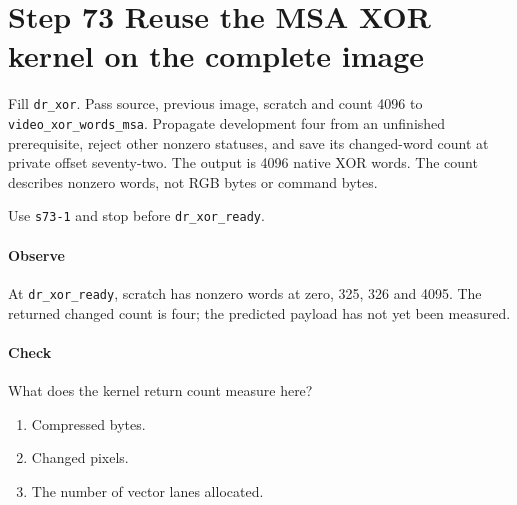 \section{Step 73 Reuse the MSA XOR kernel on the complete image}
Fill \texttt{dr\_xor}. Pass source, previous image, scratch and count 4096 to \texttt{video\_xor\_words\_msa}. Propagate development four from an unfinished prerequisite, reject other nonzero statuses, and save its changed-word count at private offset seventy-two. The output is 4096 native XOR words. The count describes nonzero words, not RGB bytes or command bytes.

Use \texttt{s73-1} and stop before \texttt{dr\_xor\_ready}.

\paragraph{Observe} At \texttt{dr\_xor\_ready}, scratch has nonzero words at zero, 325, 326 and 4095. The returned changed count is four; the predicted payload has not yet been measured.

\paragraph{Check} What does the kernel return count measure here?
\begin{enumerate}[label=\Alph*.]
  \item Compressed bytes.
  \item Changed pixels.
  \item The number of vector lanes allocated.
\end{enumerate}
